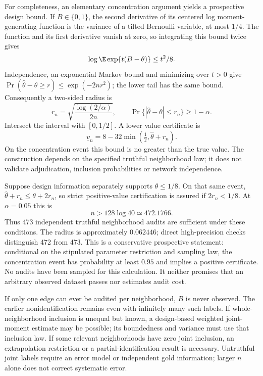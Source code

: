 For completeness, an elementary concentration argument yields a prospective
design bound. If $B\in\{0,1\}$, the second derivative of its centered log
moment-generating function is the variance of a tilted Bernoulli variable,
at most $1/4$. The function and its first derivative vanish at zero, so
integrating this bound twice gives
\begin{equation}
 \log\E\exp\{t(B-\theta)\}\leq t^2/8.
 \label{exec17:s7-mgf}
\end{equation}
Independence, an exponential Markov bound and minimizing over $t>0$ give
$\Pr(\widehat\theta-\theta\geq r)\leq\exp(-2nr^2)$; the lower tail has
the same bound. Consequently a two-sided radius is
\begin{equation}
 r_n=\sqrt{\frac{\log(2/\alpha)}{2n}},\qquad
 \Pr\{|\widehat\theta-\theta|\leq r_n\}\geq1-\alpha.
 \label{exec17:s7-radius}
\end{equation}
Intersect the interval with $[0,1/2]$. A lower value certificate is
\begin{equation}
 \underline v_n=8-32\min(\tfrac12,\widehat\theta+r_n).
 \label{exec17:s7-certificate}
\end{equation}
On the concentration event this bound is no greater than the true value.
The construction depends on the specified truthful neighborhood law; it does
not validate adjudication, inclusion probabilities or network independence.

Suppose design information separately supports $\theta\leq1/8$. On that same
event, $\widehat\theta+r_n\leq\theta+2r_n$, so strict positive-value
certification is assured if $2r_n<1/8$. At $\alpha=0.05$ this is
\begin{equation}
 n>128\log40\simeq472.1766.
 \label{exec17:s7-sample-size}
\end{equation}
Thus 473 independent truthful neighborhood audits are sufficient under these
conditions. The radius is approximately $0.062446$; direct high-precision
checks distinguish 472 from 473. This is a conservative prospective statement:
conditional on the stipulated parameter restriction and sampling law, the
concentration event has probability at least $0.95$ and implies a positive
certificate. No audits have been sampled for this calculation. It neither
promises that an arbitrary observed dataset passes nor estimates audit cost.
\citep{exec17_s7_math}

If only one edge can ever be audited per neighborhood, $B$ is never observed.
The earlier nonidentification remains even with infinitely many such labels.
If whole-neighborhood inclusion is unequal but known, a design-based weighted
joint-moment estimate may be possible; its boundedness and variance must use
that inclusion law. If some relevant neighborhoods have zero joint inclusion,
an extrapolation restriction or a partial-identification result is necessary.
Untruthful joint labels require an error model or independent gold information;
larger $n$ alone does not correct systematic error.

